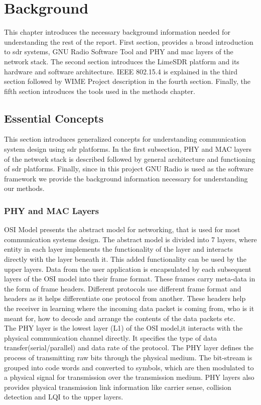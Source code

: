 \chapter{Background}
This chapter introduces the necessary background information needed for understanding the rest of the report.
First section, provides a broad introduction to \ac{sdr} systems, GNU Radio Software Tool and \ac{PHY} and \ac{mac} layers of the network stack.
The second section introduces the LimeSDR platform and its hardware and software architecture.
IEEE 802.15.4 is explained in the third section followed by WIME Project description in the fourth section.
Finally, the fifth section introduces the tools used in the methods chapter.


\section{Essential Concepts}
This section introduces generalized concepts for understanding communication system design using \ac{sdr} platforms. In the first subsection, PHY and MAC layers of the network stack is described followed by general architecture and functioning of \ac{sdr} platforms. Finally, since in this project GNU Radio is used as the software framework we provide the background information necessary for understanding our methods.

\subsection{PHY and MAC Layers}
\ac{OSI} Model \cite{noauthor_iso/iec_nodate} presents the abstract model for networking, that is used for most communication systems design.
The abstract model is divided into 7 layers,  where entity in each layer implements the functionality of the layer and interacts directly with the layer beneath it.
This added functionality can be used by the upper layers.
Data from the user application is encapsulated by each subsequent layers of the \ac{OSI} model into their frame format.
These frames carry meta-data in the form of frame headers.
Different protocols use different frame format and headers  as it helps differentiate one protocol from another.
These headers help the receiver in learning where the incoming data packet is coming from, who is it meant for, how to decode and arrange the contents of the data packets etc.\\

The \ac{PHY} layer is the lowest layer (L1) of the \ac{OSI} model,it interacts with the physical communication channel directly.
It specifies the type of data transfer(serial/parallel) and data rate of the protocol.
The \ac{PHY} layer defines the process of transmitting raw bits through the physical medium.
The bit-stream is grouped into code words and converted to symbols, which are then modulated to a physical signal for transmission over the transmission medium.
\ac{PHY} layers also provides physical transmission link information like carrier sense, collision detection and \ac{LQI}  to the upper layers. \\


